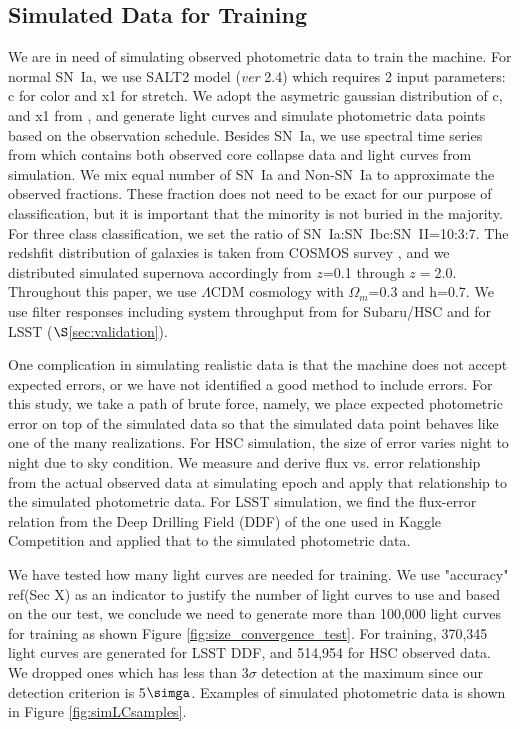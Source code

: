 \documentclass[useamsfonts]{pasj01}
\begin{document}
\subsection{Simulated Data for Training}
\label{sec:training}
We are in need of simulating observed photometric data to train the machine.  
For normal SN~Ia, we use SALT2 \citep{guy10b} model ({\it ver} 2.4) which requires 2 input parameters:
c for color and x1 for stretch.
We adopt the asymetric gaussian distribution of c, and x1 from \citet{mosher14a}, and generate
light curves and simulate photometric data points based on the observation schedule. 
Besides SN~Ia, we use spectral time series from \citet{kessler19b} which contains both observed
core collapse data and light curves from simulation.
We mix equal number of SN~Ia and Non-SN~Ia to approximate the observed fractions. 
These fraction does not need to be exact for our purpose of classification, but it is important
that the minority is not buried in the majority.
For three class classification, we set the ratio of SN~Ia:SN~Ibc:SN~II=10:3:7.
The redshfit distribution of galaxies is taken from COSMOS survey \citep{laigle16a}, and we distributed
simulated supernova accordingly from $z$=0.1 through $z=$2.0.
Throughout this paper, we use $\Lambda$CDM cosmology with $\Omega_{m}$=0.3 and h=0.7.
We use filter responses including system throughput from \citet{kawanomoto18a} for Subaru/HSC and
\citet{ivezic19a} for LSST ($\S$\ref{sec:validation}). 

One complication in simulating realistic data is that the machine does not accept expected errors,
or we have not identified a good method to include errors.   
For this study, we take a path of brute force, namely, we place expected photometric error on top 
of the simulated data so that the simulated data point behaves like one of the many realizations.
For HSC simulation, the size of error varies night to night due to sky condition. 
We measure and derive flux vs. error relationship from the actual observed data at simulating epoch 
and apply that relationship to the simulated photometric data.
For LSST simulation, we find the flux-error relation from the Deep Drilling Field (DDF) of the one
used in Kaggle Competition \citep{malz19a} and applied that to the simulated photometric data.

We have tested how many light curves are needed for training.  We use "accuracy" ref(Sec X) as an 
indicator to justify the number of light curves to use and based on the our test, we conclude we need 
to generate more than 100,000 light curves for training as shown Figure \ref{fig:size_convergence_test}.
For training, 370,345 light curves are generated for LSST DDF, and 514,954 for HSC observed data.
We dropped ones which has less than 3$\sigma$ detection at the maximum since our detection criterion
is 5$\simga$.  %
Examples of simulated photometric data is shown in Figure \ref{fig:simLCsamples}.
\end{document}
